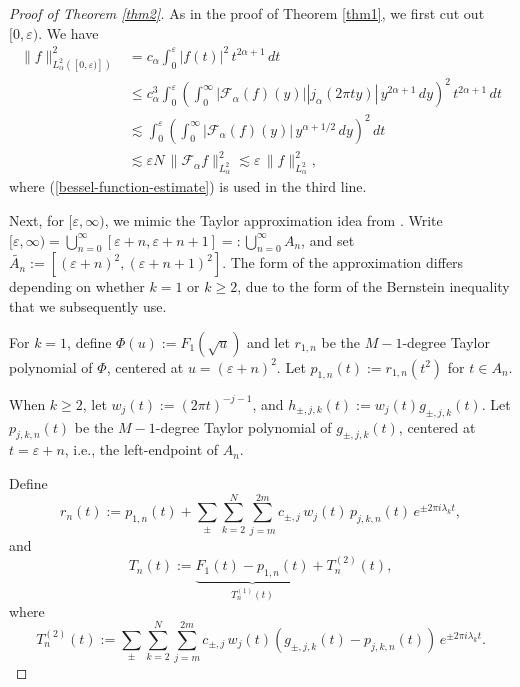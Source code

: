 \documentclass[11pt,a4paper,reqno,dvipsnames]{amsart}
\newcommand{\F}{\mathcal{F}}
\newcommand{\ep}{\varepsilon}
\renewcommand{\ge}{\geqslant}
\renewcommand{\le}{\leqslant}
\numberwithin{equation}{section}
\theoremstyle{plain}
\theoremstyle{definition}
\theoremstyle{remark}
\begin{document}
\begin{proof}[Proof of Theorem \ref{thm2}]
As in the proof of Theorem \ref{thm1}, we first cut out $[0, \ep)$. We have
\begin{align*}
    \|f\|_{L^2_\alpha([0, \ep)])}^2 &= c_\alpha \int_0^\ep |f(t)|^2\, t^{2\alpha + 1}\, dt\\
    &\le c_\alpha^3 \int_0^\ep \left( \int_0^\infty |\mathcal{F}_\alpha(f)(y)| |j_\alpha(2\pi ty)|\, y^{2\alpha + 1}\, dy \right)^2\, t^{2\alpha + 1}\, dt\\
    &\lesssim \int_0^\ep \left( \int_0^\infty |\mathcal{F}_\alpha(f)(y)|\, y^{\alpha + 1/2} \, dy \right)^2 \, dt\\
    &\lesssim \ep N\, \|\F_\alpha f\|^2_{L^2_\alpha} \lesssim \ep \, \|f\|^2_{L^2_\alpha},
\end{align*}
where (\ref{bessel-function-estimate}) is used in the third line.

Next, for $[\ep,\infty)$, we mimic the Taylor approximation idea from \cite{k1}. Write $[\ep, \infty) = \bigcup_{n=0}^\infty [\ep + n, \ep + n + 1] =: \bigcup_{n=0}^\infty A_n$, and set $\widetilde{A_n} := [(\ep + n)^2, (\ep + n + 1)^2]$. The form of the approximation differs depending on whether $k = 1$ or $k \ge 2$, due to the form of the Bernstein inequality that we subsequently use.

For $k = 1$, define $\Phi(u) := F_1(\sqrt{u})$ and let $r_{1,n}$ be the $M-1$-degree Taylor polynomial of $\Phi$, centered at $u = (\ep + n)^2$. Let $p_{1,n}(t) := r_{1,n}(t^2)$ for $t \in A_n$. 

When $k \ge 2$, let $w_j(t) := (2\pi t)^{-j-1}$, and $h_{\pm, j,k}(t) := w_j(t) g_{\pm, j,k}(t)$. Let $p_{j,k,n}(t)$ be the $M-1$-degree Taylor polynomial of $g_{\pm,j,k}(t)$, centered at $t = \ep + n$, i.e., the left-endpoint of $A_n$.

Define $$r_n(t) := p_{1,n}(t) + \sum_{\pm} \sum_{k=2}^N \sum_{j=m}^{2m} c_{\pm, j}\, w_j(t)\,  p_{j,k,n}(t)\, e^{\pm 2\pi i\lambda_k t},$$
and 
$$T_n(t) :=  \underbrace{F_1(t) - p_{1,n}(t)}_{T_n^{(1)}(t)} + T_n^{(2)}(t),$$
where
$$T_n^{(2)}(t) := \sum_{\pm} \sum_{k=2}^N \sum_{j=m}^{2m} c_{\pm, j}\, w_j(t)\left(g_{\pm, j,k}(t)  - p_{j,k,n}(t) \right)\, e^{\pm 2\pi i\lambda_k t}.$$


\end{proof}
\end{document}
